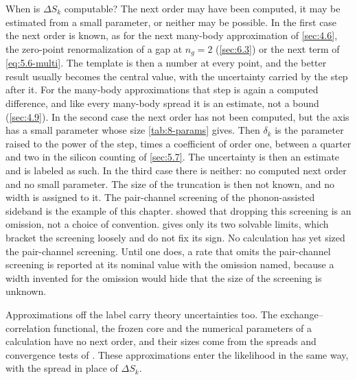When is $\Delta S_k$ computable? The next order may have been computed, it may be estimated from a small parameter, or neither may be possible. In the first case the next order is known, as for the next many-body approximation of \cref{sec:4.6}, the zero-point renormalization of a gap at $n_g = 2$ (\cref{sec:6.3}) or the next term of \cref{eq:5.6-multi}. The template is then a number at every point, and the better result usually becomes the central value, with the uncertainty carried by the step after it. For the many-body approximations that step is again a computed difference, and like every many-body spread it is an estimate, not a bound (\cref{sec:4.9}). In the second case the next order has not been computed, but the axis has a small parameter whose size \cref{tab:8-params} gives. Then $\delta_k$ is the parameter raised to the power of the step, times a coefficient of order one, between a quarter and two in the silicon counting of \cref{sec:5.7}. The uncertainty is then an estimate and is labeled as such. In the third case there is neither: no computed next order and no small parameter. The size of the truncation is then not known, and no width is assigned to it. The pair-channel screening of the phonon-assisted sideband is the example of this chapter.  showed that dropping this screening is an omission, not a choice of convention.  gives only its two solvable limits, which bracket the screening loosely and do not fix its sign. No calculation has yet sized the pair-channel screening. Until one does, a rate that omits the pair-channel screening is reported at its nominal value with the omission named, because a width invented for the omission would hide that the size of the screening is unknown.

Approximations off the label carry theory uncertainties too. The exchange--correlation functional, the frozen core and the numerical parameters of a calculation have no next order, and their sizes come from the spreads and convergence tests of . These approximations enter the likelihood in the same way, with the spread in place of $\Delta S_k$.


